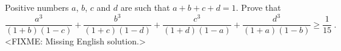 \problem{}
Positive numbers $a$, $b$, $c$ and $d$ are such that $a + b + c + d = 1$.
Prove that
\[
   \frac{a^3}{(1 + b) (1 - c)}
   +
   \frac{b^3}{(1 + c) (1 - d)}
   +
   \frac{c^3}{(1 + d) (1 - a)}
   +
   \frac{d^3}{(1 + a) (1 - b)}
\geq
   \frac{1}{15}\:.
\]
\solution
<FIXME: Missing English solution.>
\endproblem
